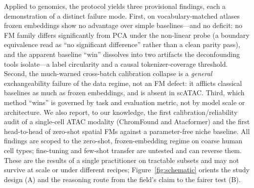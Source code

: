 \documentclass[fleqn,10pt,lineno]{wlpeerj}  %
\begin{document}
Applied to genomics, the protocol yields three provisional findings, each a demonstration of a distinct failure mode. First, on vocabulary-matched atlases frozen embeddings show no advantage over simple baselines---and no deficit: no FM family differs significantly from PCA under the non-linear probe (a boundary equivalence read as ``no significant difference'' rather than a clean parity pass), and the apparent baseline ``win'' dissolves into two artifacts the deconfounding tools isolate---a label circularity and a causal tokenizer-coverage threshold. Second, the much-warned cross-batch calibration collapse is a \emph{general} exchangeability failure of the data regime, not an FM defect: it afflicts classical baselines as much as frozen embeddings, and is absent in scATAC. Third, which method ``wins'' is governed by task and evaluation metric, not by model scale or architecture. We also report, to our knowledge, the first calibration/reliability audit of a single-cell ATAC modality (ChromFound and Atacformer) and the first head-to-head of zero-shot spatial FMs against a parameter-free niche baseline. All findings are scoped to the zero-shot, frozen-embedding regime on coarse human cell types; fine-tuning and few-shot transfer are untested and can reverse them. These are the results of a single practitioner on tractable subsets and may not survive at scale or under different recipes; Figure~\ref{fig:schematic} orients the study design (A) and the reasoning route from the field's claim to the fairer test (B).
\end{document}
